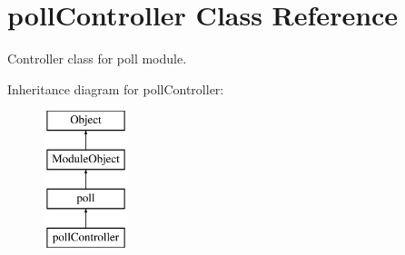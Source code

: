 \hypertarget{classpollController}{\section{poll\-Controller Class Reference}
\label{classpollController}
}


Controller class for poll module.  


Inheritance diagram for poll\-Controller\-:\begin{figure}[H]
\begin{center}
\leavevmode
\includegraphics[height=4.000000cm]{classpollController}
\end{center}
\end{figure}
